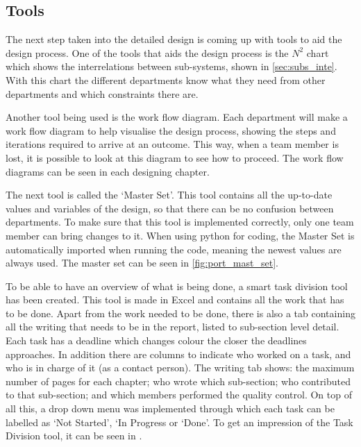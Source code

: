
\subsection{Tools}

The next step taken into the detailed design is coming up with tools to aid the design process. One of the tools that aids the design process is the $N^2$ chart which shows the interrelations between sub-systems, shown in \autoref{sec:subs_inte}. With this chart the different departments know what they need from other departments and which constraints there are. 

Another tool being used is the work flow diagram. Each department will make a work flow diagram to help visualise the design process, showing the steps and iterations required to arrive at an outcome. This way, when a team member is lost, it is possible to look at this diagram to see how to proceed. The work flow diagrams can be seen in each designing chapter. 

The next tool is called the `Master Set'. This tool contains all the up-to-date values and variables of the design, so that there can be no confusion between departments. To make sure that this tool is implemented correctly, only one team member can bring changes to it. When using python for coding, the Master Set is automatically imported when running the code, meaning the newest values are always used. The master set can be seen in \autoref{fig:port_mast_set}. 

To be able to have an overview of what is being done, a smart task division tool has been created. This tool is made in Excel and contains all the work that has to be done. Apart from the work needed to be done, there is also a tab containing all the writing that needs to be in the report, listed to sub-section level detail. Each task has a deadline which changes colour the closer the deadlines approaches. In addition there are columns to indicate who worked on a task, and who is in charge of it (as a contact person). The writing tab shows: the maximum number of pages for each chapter; who wrote which sub-section; who contributed to that sub-section; and which members performed the quality control. On top of all this, a drop down menu was implemented through which each task can be labelled as `Not Started', `In Progress or `Done'. To get an impression of the Task Division tool, it can be seen in .


